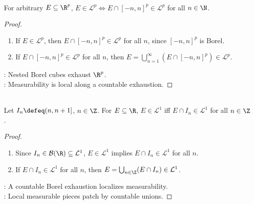 \begin{proposition} \label{prop:local-measurability-bounded-cubes} \\
For arbitrary $E\subseteq\R^p$, $E\in\mathcal{L}^p\Longleftrightarrow E\cap[-n,n]^p\in\mathcal{L}^p$ for all $n\in\N$.
\begin{proof}
\begin{enumerate}[label=\roman*.]
\setlength{\itemsep}{0pt}
\item[$(\Rightarrow)$] If $E\in\mathcal{L}^p$, then $E\cap[-n,n]^p\in\mathcal{L}^p$ for all $n$, since $[-n,n]^p$ is Borel.
\item[$(\Leftarrow)$] If $E\cap[-n,n]^p\in\mathcal{L}^p$ for all $n$, then $E=\bigcup_{n=1}^{\infty}(E\cap[-n,n]^p)\in\mathcal{L}^p$.
\end{enumerate}
: Nested Borel cubes exhaust $\R^p$.\\
: Measurability is local along a countable exhaustion.
\end{proof}
\end{proposition}

\begin{proposition} \label{prop:real-line-local-measurability-unit-intervals} \\
Let $I_n\defeq(n,n+1]$, $n\in\Z$. For $E\subseteq\R$, $E\in\mathcal{L}^1$ iff $E\cap I_n\in\mathcal{L}^1$ for all $n\in\Z$.
\begin{proof}
\begin{enumerate}[label=\roman*.]
\setlength{\itemsep}{0pt}
\item[$(\Rightarrow)$] Since $I_n\in\mathcal{B}(\R)\subseteq\mathcal{L}^1$, $E\in\mathcal{L}^1$ implies $E\cap I_n\in\mathcal{L}^1$ for all $n$.
\item[$(\Leftarrow)$] If $E\cap I_n\in\mathcal{L}^1$ for all $n$, then $E=\bigcup_{n\in\Z}(E\cap I_n)\in\mathcal{L}^1$.
\end{enumerate}
: A countable Borel exhaustion localizes measurability.\\
: Local measurable pieces patch by countable unions.
\end{proof}
\end{proposition}

